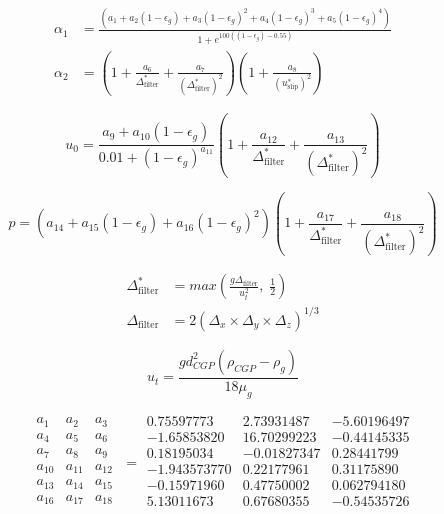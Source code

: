 \begin{align}
    \alpha_1 &= \frac{\left(a_1 + a_2(1 - \epsilon_g) + a_3(1 - \epsilon_g)^2 + a_4(1 - \epsilon_g)^3 + a_5(1 - \epsilon_g)^4 \right)}{1 + e^{100 \left((1 - \epsilon_g) - 0.55 \right)}} \\
    \alpha_2 &= \left(1 + \frac{a_6}{\Delta_{\text{filter}}^*} + \frac{a_7}{(\Delta_{\text{filter}}^*)^2} \right) \left(1 + \frac{a_8}{(u_{\text{slip}}^*)^2} \right)
\end{align}

\begin{equation}
    u_0 = \frac{a_9 + a_{10} (1 - \epsilon_g)}{0.01 + (1 - \epsilon_g)^{a_{11}}} \left(1 + \frac{a_{12}}{\Delta_{\text{filter}}^*} + \frac{a_{13}}{(\Delta_{\text{filter}}^*)^2} \right)
\end{equation}

\begin{equation}
    p = \left(a_{14} + a_{15}(1 - \epsilon_g) + a_{16}(1 - \epsilon_g)^2 \right) \left(1 + \frac{a_{17}}{\Delta_{\text{filter}}^*} + \frac{a_{18}}{(\Delta_{\text{filter}}^*)^2} \right)
\end{equation}

\begin{align}
    \Delta_{\text{filter}}^* &= max\left( \frac{g \Delta_{\text{filter}}}{u_t^2}, \; \frac{1}{2} \right) \\
    \Delta_{\text{filter}} &= 2 (\Delta_x \times \Delta_y \times \Delta_z)^{1/3}
\end{align}

\begin{equation}
    u_t = \frac{g d_{CGP}^2 (\rho_{CGP} - \rho_g)}{18 \mu_g}
\end{equation}

\begin{equation}
    \begin{matrix}
        a_1    & a_2    & a_3 \\
        a_4    & a_5    & a_6 \\
        a_7    & a_8    & a_9 \\
        a_{10} & a_{11} & a_{12} \\
        a_{13} & a_{14} & a_{15} \\
        a_{16} & a_{17} & a_{18} \\
    \end{matrix}
    \; =
    \begin{array}{rrr}
        0.75597773   & 2.73931487  & -5.60196497 \\
        -1.65853820  & 16.70299223 & -0.44145335 \\
        0.18195034   & -0.01827347 & 0.28441799  \\
        -1.943573770 & 0.22177961  & 0.31175890  \\
        -0.15971960  & 0.47750002  & 0.062794180 \\
        5.13011673   & 0.67680355  & -0.54535726 \\
    \end{array}
\end{equation}

